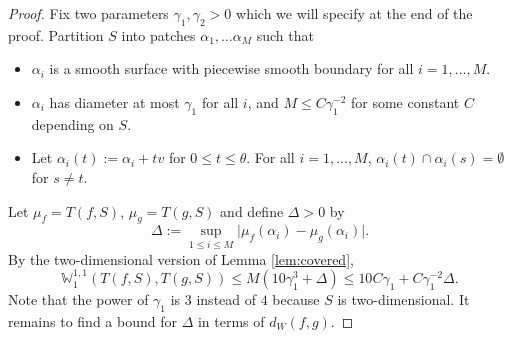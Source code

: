 \documentclass[11pt]{article}
\theoremstyle{remark}
\theoremstyle{definition}
\newcommand{\m}[1]{\mathbb{#1}}
\begin{document}
\begin{proof}
Fix two parameters $\gamma_1, \gamma_2>0$ which we will specify at the end of the proof. Partition $S$ into patches $\alpha_1,\ldots \alpha_M$ such that 
\begin{itemize}
	\item $\alpha_i$ is a smooth surface with piecewise smooth boundary for all $i=1,...,M$.
	\item $\alpha_i$ has diameter at most $\gamma_1$ for all $i$, and $M\leq C \gamma_1^{-2}$ for some constant $C$ depending on $S$.
	\item Let $\alpha_i(t):=\alpha_i+ tv$ for $0\leq t\leq \theta$. For all $i=1,...,M$, $\alpha_i(t)\cap \alpha_i(s) = \emptyset$ for $s\neq t$.
\end{itemize}
Let 
$\mu_f=T(f, S)$, $\mu_g=T(g, S)$ and define $\Delta>0$ by
\begin{equation}\label{eq:Delta_1}
	\Delta := \sup_{1\leq i\leq M} \bigg|\mu_f(\alpha_i)-\mu_g(\alpha_i)\bigg|.
\end{equation}
By the two-dimensional version of Lemma \ref{lem:covered},
\begin{equation}\label{eq:boundary_dist_Delta_bound_1}
	\m W^{1,1}_1(T(f, S),T(g, S)) \leq M(10\gamma_1^3 + \Delta) \leq 10 C \gamma_1 + C \gamma_1^{-2} \Delta. 
\end{equation}
Note that the power of $\gamma_1$ is $3$ instead of $4$ because $S$ is two-dimensional. It remains to find a bound for $\Delta$ in terms of $d_W(f,g)$. 


\end{proof}
\end{document}
